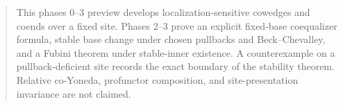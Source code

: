 


\maketitle

\begin{abstract}
This phases 0--3 preview develops localization-sensitive cowedges and coends
over a fixed site.  Phases 2--3 prove an explicit fixed-base coequalizer
formula, stable base change under chosen pullbacks and Beck--Chevalley, and a
Fubini theorem under stable-inner existence.  A counterexample on a
pullback-deficient site records the exact boundary of the stability theorem.
Relative co-Yoneda, profunctor composition, and site-presentation invariance
are not claimed.
\end{abstract}

\tableofcontents




\enlargethispage{3\baselineskip}




